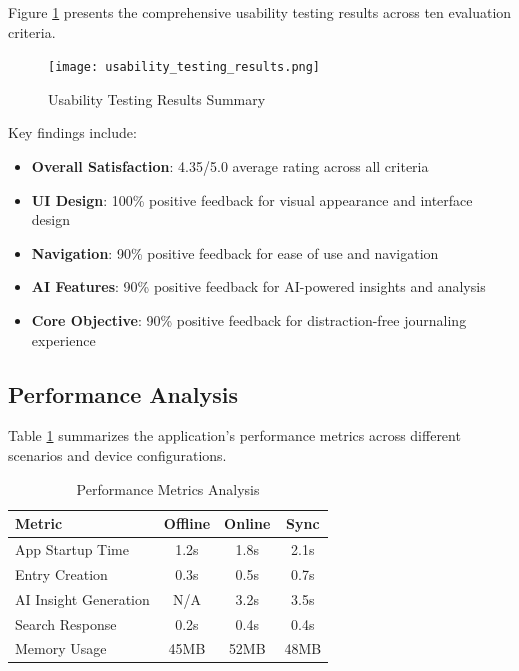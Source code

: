 \documentclass[conference]{IEEEtran}
\begin{document}
{\begin{IEEEkeywords}
Figure \ref{fig:usability_results} presents the comprehensive usability testing results across ten evaluation criteria.

\begin{figure}[htbp]
\centerline{\texttt{[image: usability\_testing\_results.png]}}
\caption{Usability Testing Results Summary}
\label{fig:usability_results}
\end{figure}

Key findings include:
\begin{itemize}
\item \textbf{Overall Satisfaction}: 4.35/5.0 average rating across all criteria
\item \textbf{UI Design}: 100\% positive feedback for visual appearance and interface design
\item \textbf{Navigation}: 90\% positive feedback for ease of use and navigation
\item \textbf{AI Features}: 90\% positive feedback for AI-powered insights and analysis
\item \textbf{Core Objective}: 90\% positive feedback for distraction-free journaling experience
\end{itemize}

\subsection{Performance Analysis}

Table \ref{table:performance_metrics} summarizes the application's performance metrics across different scenarios and device configurations.

\begin{table}[htbp]
\caption{Performance Metrics Analysis}
\begin{center}
\begin{tabular}{|l|c|c|c|}
\hline
\textbf{Metric} & \textbf{Offline} & \textbf{Online} & \textbf{Sync} \\
\hline
App Startup Time & 1.2s & 1.8s & 2.1s \\
Entry Creation & 0.3s & 0.5s & 0.7s \\
AI Insight Generation & N/A & 3.2s & 3.5s \\
Search Response & 0.2s & 0.4s & 0.4s \\
Memory Usage & 45MB & 52MB & 48MB \\
\hline
\end{tabular}
\label{table:performance_metrics}
\end{center}
\end{table}


\end{IEEEkeywords}}
\end{document}

